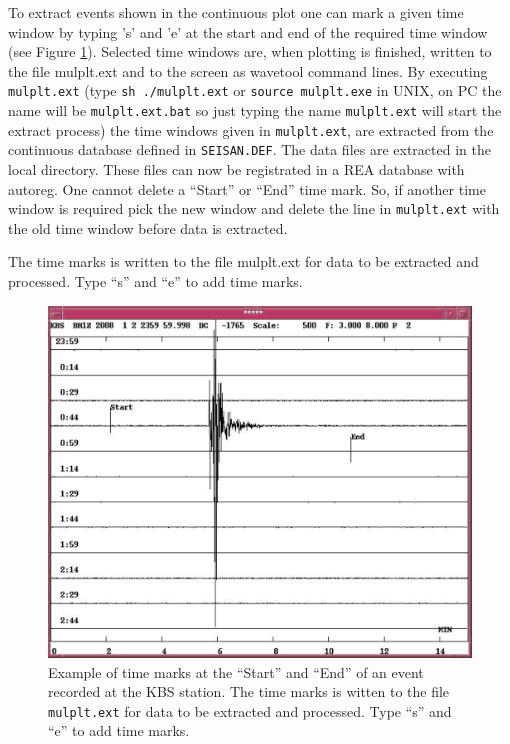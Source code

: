 To extract events shown in the continuous plot one can mark a given 
time window by typing 's' and 'e' at the start and end of the required 
time window (see Figure \ref{fig:mulplt.ext}). Selected time windows are, when plotting 
is finished, written to the file mulplt.ext and to the screen as wavetool 
command lines. By executing \texttt{mulplt.ext} (type \texttt{sh ./mulplt.ext} or 
\texttt{source mulplt.exe} in UNIX, on PC the name will be \texttt{mulplt.ext.bat} 
so just typing the name \texttt{mulplt.ext} will start the extract process) 
the time windows given in \texttt{mulplt.ext}, are extracted from the continuous 
database defined in \texttt{SEISAN.DEF}. The data files are 
extracted in the local directory. These files can now be registrated in a REA 
database with autoreg. One cannot delete a ``Start'' or ``End'' time mark. 
So, if another time window is required pick the new window and delete the 
line in \texttt{mulplt.ext} with the old time window before data is extracted. 

The time marks is written to the file mulplt.ext for data to be extracted 
and processed. Type ``s'' and ``e'' to add time marks. 

\begin{figure}
\centerline{\includegraphics[width=0.9\linewidth]{fig/fig16}}
\caption{Example of time marks at the ``Start'' and ``End'' of an 
event recorded at the KBS station. The time marks is witten to the file 
\texttt{mulplt.ext} for data to be extracted and processed. Type ``s'' and ``e'' 
to add time marks.}
\label{fig:mulplt.ext}
\end{figure}


